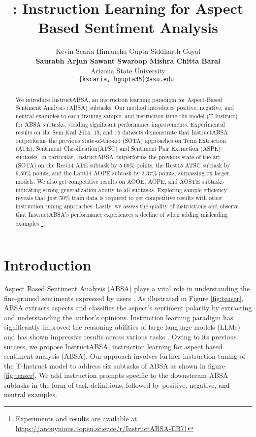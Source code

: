 \documentclass[11pt]{article}
\title{ \name{}: Instruction Learning for Aspect Based Sentiment Analysis}
\author{Kevin Scaria \hspace{9pt} Himanshu Gupta \hspace{9pt} Siddharth Goyal\hspace{9pt} \\ \textbf{Saurabh Arjun Sawant \hspace{9pt} Swaroop Mishra \hspace{9pt}Chitta Baral}\\
  Arizona State University \\
\tt\small   \texttt{\{kscaria, hgupta35\}}@asu.edu
  }
\newcommand{\name}{\textsc{I}nstruct\textsc{ABSA}\xspace}
\begin{document}
\maketitle
\begin{abstract}
We introduce \name{}, an instruction learning paradigm for Aspect-Based Sentiment Analysis (ABSA) subtasks.
Our method introduces positive, negative, and neutral examples to each training sample, and instruction tune the model (T-Instruct) for ABSA subtasks, yielding significant performance improvements.
Experimental results on the Sem Eval 2014, 15, and 16 datasets demonstrate that \name{} outperforms the previous state-of-the-art (SOTA) approaches on Term Extraction (ATE), Sentiment Classification(ATSC) and Sentiment Pair Extraction (ASPE) subtasks.
In particular, \name{} outperforms the previous state-of-the-art (SOTA) on the Rest14 ATE subtask by 5.69\% points, the Rest15 ATSC subtask by 9.59\% points, and the Lapt14 AOPE subtask by 3.37\% points, surpassing 7x larger models.
We also get competitive results on AOOE, AOPE, and AOSTE subtasks indicating strong generalization ability to all subtasks. 
Exploring sample efficiency reveals that just 50\% train data is required to get competitive results with other instruction tuning approaches. 
Lastly, we assess the quality of instructions and observe that \name{}'s performance experiences a decline of  when adding misleading examples
\footnote{Experiments and results are available at 
\url{https://anonymous.4open.science/r/InstructABSA-EB71}
}.
\end{abstract}

\section{Introduction}
Aspect Based Sentiment Analysis (ABSA) plays a vital role in understanding the fine-grained sentiments expressed by users \cite{Zhang2012SentimentAA}. As illustrated in Figure \ref{fig:teaser}, ABSA extracts aspects and classifies the aspect's sentiment polarity by extracting and understanding the author's opinions. 
Instruction learning paradigm \cite{mishra-etal-2022-cross, wei2022finetuned,gupta2023instruction} has significantly improved the reasoning abilities of large language models (LLMs) and has shown impressive results across various tasks \cite{wang2022self,lu2022learn}.  
Owing to its previous success, we propose \name{}, instruction learning for aspect based sentiment analysis (ABSA).  
Our approach involves further instruction tuning of the T-Instruct model \cite{wang-etal-2022-super} to address six subtasks of ABSA as shown in figure \ref{fig:teaser}. We add instruction prompts specific to the downstream ABSA subtasks in the form of task definitions, followed by positive, negative, and neutral examples.
\end{document}
